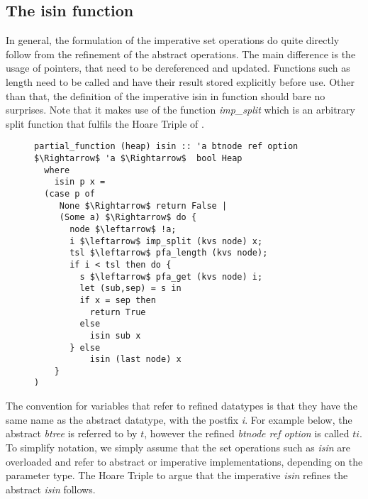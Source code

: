 
\subsection{The isin function}

In general, the formulation of the imperative set operations
do quite directly follow
from the refinement of the abstract operations.
The main difference is the usage of pointers,
that need to be dereferenced and updated.
Functions such as length need to be called and have their result
stored explicitly before use.
Other than that, the definition of the imperative isin in 
function should bare no surprises.
Note that it makes use of the function \textit{imp\_split}
which is an arbitrary split function that fulfils the Hoare Triple
of .

\begin{figure}
\begin{lstlisting}[mathescape=true, language=Isabelle, label={lst:imp-isin-fun},
    caption={The imperative isin function}]
partial_function (heap) isin :: 'a btnode ref option $\Rightarrow$ 'a $\Rightarrow$  bool Heap
  where
    isin p x =
  (case p of
     None $\Rightarrow$ return False |
     (Some a) $\Rightarrow$ do {
       node $\leftarrow$ !a;
       i $\leftarrow$ imp_split (kvs node) x;
       tsl $\leftarrow$ pfa_length (kvs node);
       if i < tsl then do {
         s $\leftarrow$ pfa_get (kvs node) i;
         let (sub,sep) = s in
         if x = sep then
           return True
         else
           isin sub x
       } else
           isin (last node) x
    }
)
\end{lstlisting}
\end{figure}

The convention for variables that refer to refined datatypes
is that they have the same name as the abstract datatype,
with the postfix \textit{i}.
For example below, the abstract \textit{btree} is referred to by $t$,
however the refined \textit{btnode ref option} is called $ti$.
To simplify notation, we simply assume that the set operations
such as \textit{isin} are overloaded and refer to abstract or
imperative implementations, depending on the parameter type.
The Hoare Triple to argue that the imperative \textit{isin}
refines the abstract \textit{isin} follows.

